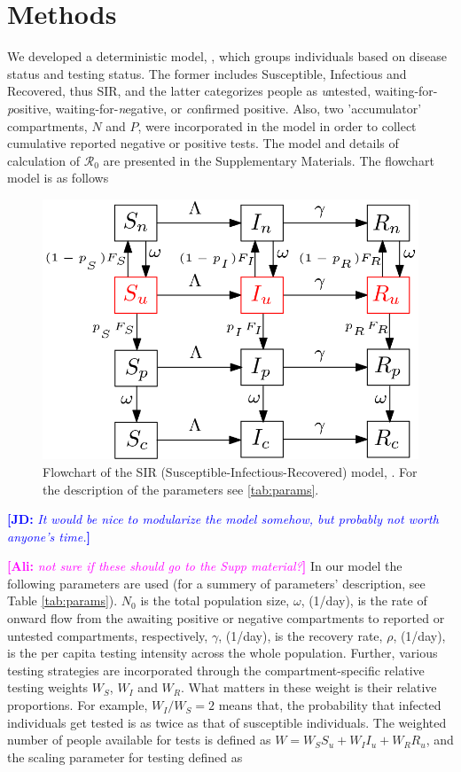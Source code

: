 \documentclass[12pt]{article}
\newcommand{\comment}{\showcomment}
\newcommand{\showcomment}[3]{\textcolor{#1}{\textbf{[#2: }\textsl{#3}\textbf{]}}}
\newcommand{\ali}[1]{\comment{magenta}{Ali}{#1}}
\newcommand{\jd}[1]{\comment{blue}{JD}{#1}}
\newcommand{\Rnum}{\mathcal{R}_0}
\theoremstyle{definition} %
\begin{document}
\section{Methods}

We developed a deterministic model, , which groups individuals based on disease status and testing status. The former includes Susceptible, Infectious and Recovered, thus SIR, and the latter categorizes people as \emph untested, waiting-for-\emph positive, waiting-for-\emph negative, or \emph confirmed positive. Also, two 'accumulator' compartments, $N$ and $P$, were incorporated in the model in order to collect cumulative reported negative or positive tests. The model and details of calculation of $\Rnum$ are presented in the Supplementary Materials. The flowchart model is as follows 

\begin{figure}[!h] 
\begin{center} 
\includegraphics[scale=0.3]{./pix/sir_comp.png}
\caption{\small Flowchart of the SIR (Susceptible-Infectious-Recovered) model, . For the description of the parameters see \cref{tab:params}.
\label{fig:flowchart}}
\end{center} 
\end{figure}

\jd{It would be nice to modularize the model somehow, but probably not worth anyone's time.}

\ali{not sure if these should go to the Supp material?} In our model the following parameters are used (for a summery of parameters' description, see Table \ref{tab:params}). $N_0$ is the total population size, $\omega$, (1/day), is the rate of onward flow from the awaiting positive or negative compartments to reported or untested compartments, respectively, $\gamma$, (1/day), is the recovery rate, $\rho$, (1/day), is the per capita testing intensity across the whole population. Further, various testing strategies are incorporated through the compartment-specific relative testing weights $W_S$, $W_I$ and $W_R$. What matters in these weight is their relative proportions. For example, $W_I/W_S=2$ means that, the probability that infected individuals get tested is as twice as that of susceptible individuals. The weighted number of people available for tests is defined as $W = W_S S_u + W_I I_u + W_R R_u$, and the scaling parameter for testing defined as
\end{document}
